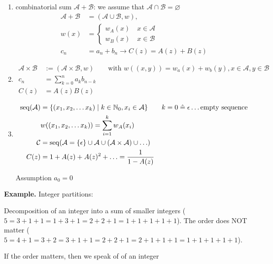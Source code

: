 \begin{enumerate}[1)]
\item combinatorial sum $\mathcal{A} + \mathcal{B}$:
    we assume that $\mathcal{A} \cap \mathcal{B} = \varnothing$
    \begin{align*}
        \mathcal{A} + \mathcal{B} &= (\mathcal{A} \cup \mathcal{B} , w), \\
        w(x) &= \begin{cases}
            {w_A(x) \quad x \in \mathcal{A}}\\
            {w_B(x) \quad x \in \mathcal{B}}
			\end{cases}\\
        c_n &= a_n + b_ n\rightarrow C(z) = A(z) + B(z)
    \end{align*}
\item
    \begin{align*}
        \mathcal{A} \times \mathcal{B}
        &:= (\mathcal{A} \times \mathcal{B}, w)
        \qquad \text{with } w((x,y)) = w_a(x) + w_b(y), x\in \mathcal{A}, y\in \mathcal{B}\\
        c_n &= \sum_{k=0}^n a_kb_{n-k}\\
        C(z) &= A(z)B(z)
    \end{align*}

\item
    \begin{align*}
        \operatorname{seq}(\mathcal{A}) &= \{ (x_1, x_2, \ldots x_k) \mid k \in \mathbb{N}_0, x_i \in \mathcal{A}\}
        \qquad k = 0 \mathrel{\hat{=}} \epsilon \ldots \text{empty sequence}\\
        &w((x_1, x_2, \ldots x_k) ) = \sum_{i=1}^{k} w_A(x_i) \\
        \mathcal{C} &= \operatorname{seq}(\mathcal{A} = \{\epsilon\} \cup \mathcal{A} \cup (\mathcal{A}\times\mathcal{A}) \cup \ldots )\\
        C(z) &= 1 + A(z) + A(z)^2 + \ldots = \frac{1}{1-A(z)} \\
    \end{align*}

    Assumption $a_0 = 0$
\end{enumerate}

\textbf{Example.}
Integer partitions:

Decomposition of an integer into a sum of smaller integers ($5 = 3+1+1= 1+3+1 = 2+2+1 = 1+1+1+1+1$). The order does NOT matter ($5= 4+1 = 3 + 2 = 3+1+1 = 2+2+1 = 2+1+1+1 = 1+1+1+1+1$).

If the order matters, then we speak of  of an integer

